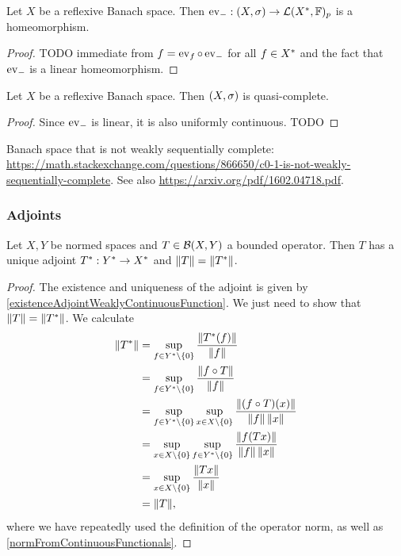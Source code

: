 \begin{lemma}
Let $X$ be a reflexive Banach space. Then $\evalMap_-: \sSet{X,\sigma} \to \contLin(\dual{X}, \F)_p$ is a homeomorphism.
\end{lemma}
\begin{proof}
TODO immediate from $f = \operatorname{ev}_f\circ \operatorname{ev}_-$ for all $f\in {X}^*$ and the fact that $\operatorname{ev}_-$ is a linear homeomorphism.
\end{proof}
\begin{corollary} \label{ReflexiveBanachSpaceWeaklyQuasiComplete}
Let $X$ be a reflexive Banach space. Then $\sSet{X,\sigma}$ is quasi-complete.
\end{corollary}
\begin{proof}
Since $\operatorname{ev}_-$ is linear, it is also uniformly continuous. TODO
\end{proof}

\begin{example}
Banach space that is not weakly sequentially complete: \url{https://math.stackexchange.com/questions/866650/c0-1-is-not-weakly-sequentially-complete}. See also \url{https://arxiv.org/pdf/1602.04718.pdf}.
\end{example}

\subsubsection{Adjoints}
\begin{proposition} \label{adjointMapIsometric}
Let $X,Y$ be normed spaces and $T\in \operatorname{\mathcal{B}}(X,Y)$ a bounded operator. Then $T$ has a unique adjoint $T^*: {Y}^*\to {X}^*$ and $\lVert T\rVert = \lVert T^*\rVert$.
\end{proposition}
\begin{proof}
The existence and uniqueness of the adjoint is given by \ref{existenceAdjointWeaklyContinuousFunction}. We just need to show that $\lVert T\rVert = \lVert T^*\rVert$. We calculate
\begin{align*}
\lVert T^*\rVert &= \sup_{f\in {Y}^*\setminus\{0\}}\frac{\lVert T^*(f)\rVert}{\lVert f\rVert} \\
&= \sup_{f\in {Y}^*\setminus\{0\}}\frac{\lVert f\circ T\rVert}{\lVert f\rVert} \\
&= \sup_{f\in {Y}^*\setminus\{0\}}\sup_{x\in X\setminus\{0\}}\frac{\lVert(f\circ T)(x)\rVert}{\lVert f\rVert\,\lVert x\rVert} \\
&= \sup_{x\in X\setminus\{0\}}\sup_{f\in {Y}^*\setminus\{0\}}\frac{\lVert f(Tx)\rVert}{\lVert f\rVert\,\lVert x\rVert} \\
&= \sup_{x\in X\setminus\{0\}}\frac{\lVert Tx\rVert}{\lVert x\rVert} \\
&= \lVert T\rVert,
\end{align*}
where we have repeatedly used the definition of the operator norm, as well as \ref{normFromContinuousFunctionals}.
\end{proof}

